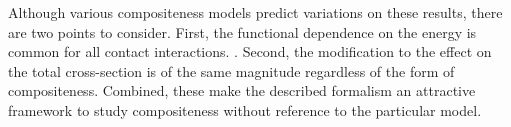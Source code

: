 Although various compositeness models predict variations on these results, there are two points to consider.
First, the functional dependence on the energy \shat is common for all contact interactions. \cite{Eichten:1984eu}.
Second, the modification to the effect on the total cross-section is of the same magnitude regardless of the form of compositeness.
Combined, these make the described formalism an attractive framework to study compositeness without reference to the particular model.


